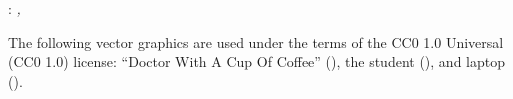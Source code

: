 
\thispagestyle{empty}

\hfill

\vfill

\noindent\myName: \textit{\myTitle,} %
\textcopyright\ \myTime

\bigskip
\noindent
The following vector graphics are used under the terms of the CC0 1.0 Universal (CC0 1.0) license: ``Doctor With A Cup Of Coffee'' (), the student (), and laptop ().







